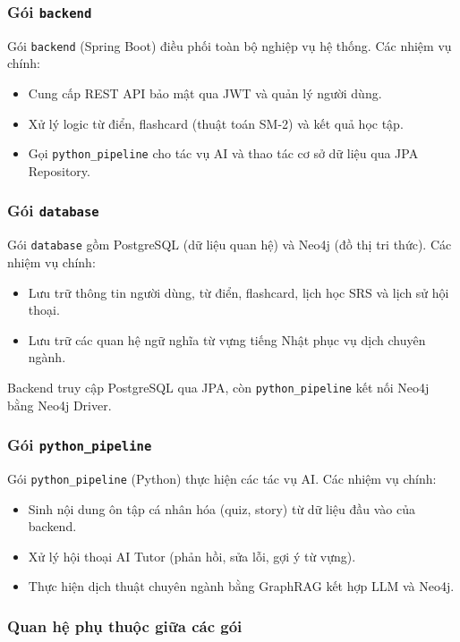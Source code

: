 \documentclass[../DoAn.tex]{subfiles}
\begin{document}
\subsubsection{Gói \texttt{backend}}

Gói \texttt{backend} (Spring Boot) điều phối toàn bộ nghiệp vụ hệ thống. Các nhiệm vụ chính:
\begin{itemize}
    \item Cung cấp REST API bảo mật qua JWT và quản lý người dùng.
    \item Xử lý logic từ điển, flashcard (thuật toán SM-2) và kết quả học tập.
    \item Gọi \texttt{python\_pipeline} cho tác vụ AI và thao tác cơ sở dữ liệu qua JPA Repository.
\end{itemize}

\subsubsection{Gói \texttt{database}}

Gói \texttt{database} gồm PostgreSQL (dữ liệu quan hệ) và Neo4j (đồ thị tri thức). Các nhiệm vụ chính:
\begin{itemize}
    \item Lưu trữ thông tin người dùng, từ điển, flashcard, lịch học SRS và lịch sử hội thoại.
    \item Lưu trữ các quan hệ ngữ nghĩa từ vựng tiếng Nhật phục vụ dịch chuyên ngành.
\end{itemize}
Backend truy cập PostgreSQL qua JPA, còn \texttt{python\_pipeline} kết nối Neo4j bằng Neo4j Driver.

\subsubsection{Gói \texttt{python\_pipeline}}

Gói \texttt{python\_pipeline} (Python) thực hiện các tác vụ AI. Các nhiệm vụ chính:
\begin{itemize}
    \item Sinh nội dung ôn tập cá nhân hóa (quiz, story) từ dữ liệu đầu vào của backend.
    \item Xử lý hội thoại AI Tutor (phản hồi, sửa lỗi, gợi ý từ vựng).
    \item Thực hiện dịch thuật chuyên ngành bằng GraphRAG kết hợp LLM và Neo4j.
\end{itemize}

\subsubsection{Quan hệ phụ thuộc giữa các gói}
\end{document}
